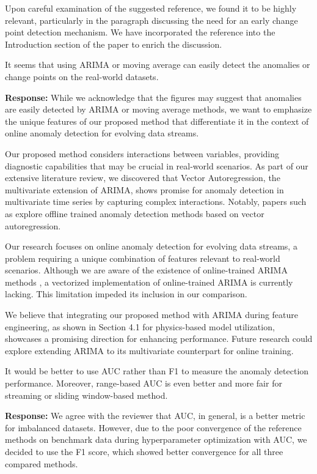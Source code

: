\documentclass{article}
\makeatletter
\newenvironment{comment}{
\begin{sloppypar}\slshape
\vspace{5 mm}
\color{blue}
 \@beginparpenalty\@M
  \begin{list}{}{\setlength{\topsep}{0ex}%
  \setlength{\leftmargin}{\rightmargin}}\item[]
 \@beginparpenalty\@endparpenalty
}
{\end{list}
\end{sloppypar}
}
\makeatother
\begin{document}
\begin{enumerate}
        Upon careful examination of the suggested reference, we found it to be highly relevant, particularly in the paragraph discussing the need for an early change point detection mechanism. We have incorporated the reference into the Introduction section of the paper to enrich the discussion.

  \item
        \begin{comment}
        It seems that using ARIMA or moving average can easily detect the anomalies or change points on the real-world datasets.
        \end{comment}
        {\bf Response:}
        While we acknowledge that the figures may suggest that anomalies are easily detected by ARIMA or moving average methods, we want to emphasize the unique features of our proposed method that differentiate it in the context of online anomaly detection for evolving data streams.

        Our proposed method considers interactions between variables, providing diagnostic capabilities that may be crucial in real-world scenarios. As part of our extensive literature review, we discovered that Vector Autoregression, the multivariate extension of ARIMA, shows promise for anomaly detection in multivariate time series by capturing complex interactions. Notably, papers such as \cite{Melnyk2016, Zhang2023} explore offline trained anomaly detection methods based on vector autoregression.

        Our research focuses on online anomaly detection for evolving data streams, a problem requiring a unique combination of features relevant to real-world scenarios. Although we are aware of the existence of online-trained ARIMA methods \cite{Anava2013}, a vectorized implementation of online-trained ARIMA is currently lacking. This limitation impeded its inclusion in our comparison.

        We believe that integrating our proposed method with ARIMA during feature engineering, as shown in Section 4.1 for physics-based model utilization, showcases a promising direction for enhancing performance. Future research could explore extending ARIMA to its multivariate counterpart for online training.

  \item
        \begin{comment}
        It would be better to use AUC rather than F1 to measure the anomaly detection performance. Moreover, range-based AUC is even better and more fair for streaming or sliding window-based method.
        \end{comment}
        {\bf Response:}
        We agree with the reviewer that AUC, in general, is a better metric for imbalanced datasets. However, due to the poor convergence of the reference methods on benchmark data during hyperparameter optimization with AUC, we decided to use the F1 score, which showed better convergence for all three compared methods. 
        

\end{enumerate}
\end{document}
